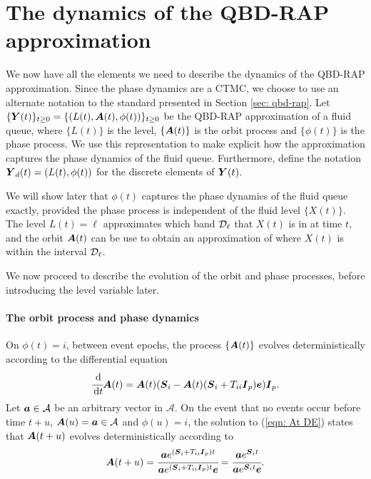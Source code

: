 \section{The dynamics of the QBD-RAP approximation}\label{sec: dynamics}
We now have all the elements we need to describe the dynamics of the QBD-RAP approximation. Since the phase dynamics are a CTMC, we choose to use an alternate notation to the standard presented in Section \ref{sec: qbd-rap}. Let \(\{\boldsymbol Y(t)\}_{t\geq0} = \{(L(t),\boldsymbol A(t),\phi(t))\}_{t\geq0}\) be the QBD-RAP approximation of a fluid queue, where \(\{L(t)\}\) is the level, \(\{\boldsymbol A(t)\}\) is the orbit process and \(\{\phi(t)\}\) is the phase process. We use this representation to make explicit how the approximation captures the phase dynamics of the fluid queue. Furthermore, define the notation \(\boldsymbol Y_d(t) = (L(t),\phi(t))\) for the discrete elements of \(\boldsymbol Y(t)\).

We will show later that \(\phi(t)\) captures the phase dynamics of the fluid queue exactly, provided the phase process is independent of the fluid level \(\{X(t)\}\). The level \(L(t)=\ell\) approximates which band \(\mathcal{D}_\ell\) that \(X(t)\) is in at time \(t\), and the orbit \(\boldsymbol A(t)\) can be use to obtain an approximation of where \(X(t)\) is within the interval \(\mathcal{D}_\ell\). 

We now proceed to describe the evolution of the orbit and phase processes, before introducing the level variable later. 

\paragraph{The orbit process and phase dynamics} On \({\phi}(t)=i\), between event epochs, the process \(\{\boldsymbol A(t)\}\) evolves deterministically according to the differential equation 
\begin{align}\label{eqn: At DE}
\cfrac{\, \mathrm{d}}{\, \mathrm{d} t}\boldsymbol A(t) = \boldsymbol A(t)(\boldsymbol{S}_i - \boldsymbol A(t) (\boldsymbol{S}_i + T_{ii}\boldsymbol{I}_p)\boldsymbol e)\boldsymbol{I}_p.
\end{align}
Let \(\boldsymbol a \in \mathcal A\) be an arbitrary vector in \(\mathcal A\). On the event that no events occur before time \(t+u\), \(\boldsymbol A(u) = \boldsymbol a\in\mathcal A\) and \({\phi}(u)=i\), the solution to (\ref{eqn: At DE}) states that \(\boldsymbol A({t+u})\) evolves deterministically according to 
\[\boldsymbol A({t+u}) =  \cfrac{\boldsymbol a e^{(\boldsymbol{S}_i+T_{ii}\boldsymbol{I}_p)t}}{\boldsymbol a e^{(\boldsymbol{S}_i+T_{ii}\boldsymbol{I}_p)t} \boldsymbol e} = \cfrac{\boldsymbol a e^{\boldsymbol{S}_i t}}{\boldsymbol a e^{\boldsymbol{S}_i t} \boldsymbol e}.\] 

